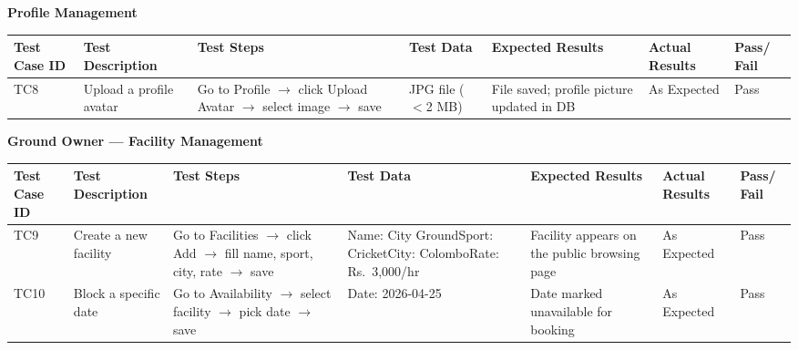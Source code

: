 \documentclass[12pt,a4paper]{article}
\begin{document}
\newpage

\begin{center}{\Large\bfseries Profile Management}\end{center}
\vspace{0.3cm}

\begin{center}
\begin{longtable}{|C{1.0cm}|L{2.5cm}|L{2.5cm}|L{3.5cm}|L{2.5cm}|L{1.5cm}|C{1.0cm}|}
\hline
\textbf{Test Case ID} & \textbf{Test Description} & \textbf{Test Steps} & \textbf{Test Data} & \textbf{Expected Results} & \textbf{Actual Results} & \textbf{Pass/ Fail}\\
\hline
\endhead

TC8
& Upload a profile avatar
& Go to Profile $\to$ click Upload Avatar $\to$ select image $\to$ save
& JPG file ($<$2 MB)
& File saved; profile picture updated in DB
& As Expected
& Pass
\\ \hline

\end{longtable}
\end{center}

\newpage

\begin{center}{\Large\bfseries Ground Owner --- Facility Management}\end{center}
\vspace{0.3cm}

\begin{center}
\begin{longtable}{|C{1.0cm}|L{2.5cm}|L{2.5cm}|L{3.5cm}|L{2.5cm}|L{1.5cm}|C{1.0cm}|}
\hline
\textbf{Test Case ID} & \textbf{Test Description} & \textbf{Test Steps} & \textbf{Test Data} & \textbf{Expected Results} & \textbf{Actual Results} & \textbf{Pass/ Fail}\\
\hline
\endhead

TC9
& Create a new facility
& Go to Facilities $\to$ click Add $\to$ fill name, sport, city, rate $\to$ save
& Name: City Ground\newline Sport: Cricket\newline City: Colombo\newline Rate: Rs.\ 3,000/hr
& Facility appears on the public browsing page
& As Expected
& Pass
\\ \hline

TC10
& Block a specific date
& Go to Availability $\to$ select facility $\to$ pick date $\to$ save
& Date: 2026-04-25
& Date marked unavailable for booking
& As Expected
& Pass
\\ \hline

\end{longtable}
\end{center}
\end{document}
